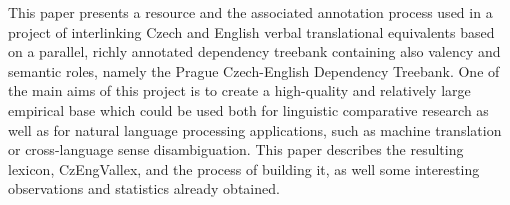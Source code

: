 This paper presents a resource and the associated annotation process used in a project of interlinking Czech and English verbal translational equivalents based on a parallel, richly annotated dependency treebank containing also valency and semantic roles, namely the Prague Czech-English Dependency Treebank. One of the main aims of this project is to create a high-quality and relatively large empirical base which could be used both for linguistic comparative research as well as for natural language processing applications, such as machine translation or cross-language sense disambiguation. This paper describes the resulting lexicon, CzEngVallex, and the process of building it, as well some interesting observations and statistics already obtained.
